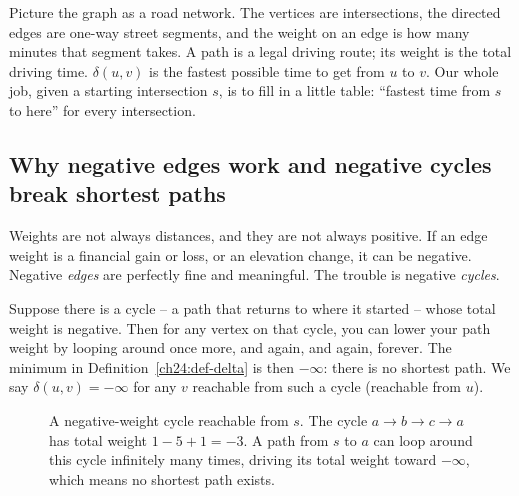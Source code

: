 \begin{intuitionbox}
Picture the graph as a road network. The vertices are intersections, the
directed edges are one-way street segments, and the weight on an edge is how many
minutes that segment takes. A path is a legal driving route; its weight is the
total driving time. $\delta(u,v)$ is the fastest possible time to get from $u$ to
$v$. Our whole job, given a starting intersection $s$, is to fill in a little
table: ``fastest time from $s$ to here'' for every intersection.
\end{intuitionbox}

\subsection{Why negative edges work and negative cycles break shortest paths}

Weights are not always distances, and they are not always positive. If an edge
weight is a financial gain or loss, or an elevation change, it can be negative.
Negative \emph{edges} are perfectly fine and meaningful. The trouble is negative
\emph{cycles}.

Suppose there is a cycle -- a path that returns to where it started -- whose total
weight is negative. Then for any vertex on that cycle, you can lower your path
weight by looping around once more, and again, and again, forever. The minimum in
Definition~\ref{ch24:def-delta} is then $-\infty$: there is no shortest path. We
say $\delta(u,v) = -\infty$ for any $v$ reachable from such a cycle (reachable
from $u$).

\begin{figure}[htbp]
\centering
{}
\caption{A negative-weight cycle reachable from $s$. The cycle $a \to b \to c \to a$ has total weight $1 - 5 + 1 = -3$. A path from $s$ to $a$ can loop around this cycle infinitely many times, driving its total weight toward $-\infty$, which means no shortest path exists.}
\label{ch24:fig-neg-cycle}
\end{figure}

